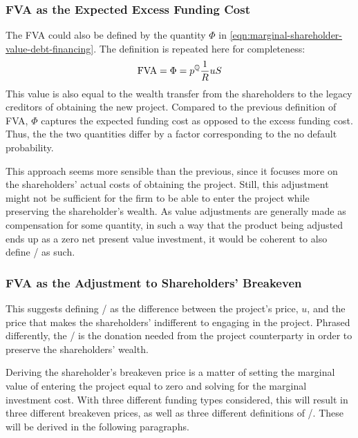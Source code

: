 \documentclass[main.tex]{subfiles}
\begin{document}
        \subsubsection*{FVA as the Expected Excess Funding Cost}
            The FVA could also be defined by the quantity $\Phi$ in \cref{eqn:marginal-shareholder-value-debt-financing}.
            The definition is repeated here for completeness:
                \begin{equation}
                    \FVA/
                    =
                        \Phi
                    =
                        p^{\rnmeasure}
                        \discountfactor
                        u
                        S
                    \label{eqn:fva-as-expected-excess-funding-cost}
                \end{equation}
            This value is also equal to the wealth transfer from the shareholders to the legacy creditors
            of obtaining the new project.
            Compared to the previous definition of FVA, 
            $\Phi$ captures the expected funding cost as opposed to the excess funding cost.
            Thus, the the two quantities differ by a factor corresponding to the no default probability.

            This approach seems more sensible than the previous, 
            since it focuses more on the shareholders' actual costs of obtaining the project.
            Still, this adjustment might not be sufficient
            for the firm to be able to enter the project while preserving the shareholder's wealth.
            As value adjustments are generally made as compensation for some quantity,
            in such a way that the product being adjusted ends up as a zero net present value investment,
            it would be coherent to also define \FVA/ as such.
            
        \subsubsection*{FVA as the Adjustment to Shareholders' Breakeven}
            This suggests defining \FVA/ as the difference between the project's price, $u$,
            and the price that makes the shareholders' indifferent to engaging in the project.
            Phrased differently, the \FVA/ is the donation needed from the project counterparty 
            in order to preserve the shareholders' wealth.

            Deriving the shareholder's breakeven price
            is a matter of setting the marginal value of entering the project equal to zero
            and solving for the marginal investment cost. 
            With three different funding types considered, this will result in three different breakeven prices,
            as well as three different definitions of \FVA/.
            These will be derived in the following paragraphs.
            
\end{document}
